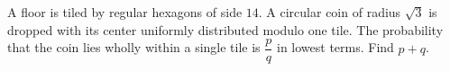 A floor is tiled by regular hexagons of side $14$. A circular coin of radius $\sqrt3$ is dropped with its center uniformly distributed modulo one tile. The probability that the coin lies wholly within a single tile is $\dfrac{p}{q}$ in lowest terms. Find $p+q$.
